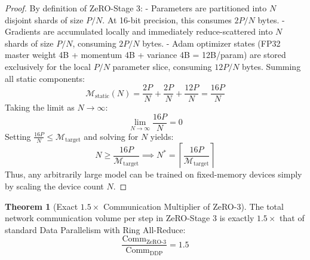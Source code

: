 \documentclass[11pt,a4paper]{article}
\theoremstyle{definition}
\newtheorem{theorem}{\textbf{Theorem}}[section]
\begin{document}
\begin{proof}
By definition of ZeRO-Stage 3:
- Parameters are partitioned into $N$ disjoint shards of size $P/N$. At 16-bit precision, this consumes $2P/N$ bytes.
- Gradients are accumulated locally and immediately reduce-scattered into $N$ shards of size $P/N$, consuming $2P/N$ bytes.
- Adam optimizer states (FP32 master weight 4B + momentum 4B + variance 4B = 12B/param) are stored exclusively for the local $P/N$ parameter slice, consuming $12P/N$ bytes.
Summing all static components:
{\boldmath
\begin{equation}
\mathcal{M}_{\text{static}}(N) = \frac{2P}{N} + \frac{2P}{N} + \frac{12P}{N} = \frac{16P}{N}
\end{equation}
}
Taking the limit as $N \to \infty$:
{\boldmath
\begin{equation}
\lim_{N \to \infty} \frac{16P}{N} = 0
\end{equation}
}
Setting $\frac{16P}{N} \le \mathcal{M}_{\text{target}}$ and solving for $N$ yields:
{\boldmath
\begin{equation}
N \ge \frac{16P}{\mathcal{M}_{\text{target}}} \implies N^* = \left\lceil \frac{16P}{\mathcal{M}_{\text{target}}} \right\rceil
\end{equation}
}
Thus, any arbitrarily large model can be trained on fixed-memory devices simply by scaling the device count $N$.
\end{proof}

\begin{theorem}[Exact $1.5\times$ Communication Multiplier of ZeRO-3]
The total network communication volume per step in ZeRO-Stage 3 is exactly $1.5\times$ that of standard Data Parallelism with Ring All-Reduce:
{\boldmath
\begin{equation}
\frac{\text{Comm}_{\text{ZeRO-3}}}{\text{Comm}_{\text{DDP}}} = 1.5
\end{equation}
}
\end{theorem}
\end{document}
